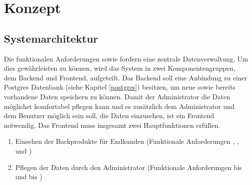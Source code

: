\chapter{Konzept}

\section{Systemarchitektur} \label{systemarchitektur}
Die funktionalen Anforderungen  sowie  fordern eine zentrale Datenverwaltung.
Um dies gewährleisten zu können, wird das System in zwei Komponentengruppen, dem Backend und Frontend, aufgeteilt.
Das Backend soll eine Anbindung zu einer Postgres Datenbank (siehe Kapitel \ref{postgres}) besitzen, um neue sowie bereits vorhandene Daten speichern zu können.
Damit der Administrator die Daten möglichst komfortabel pflegen kann und es zusätzlich dem Administrator und dem Benutzer möglich sein soll, die Daten einzusehen, ist ein Frontend notwendig.
Das Frontend muss insgesamt zwei Hauptfunktionen erfüllen.

\begin{enumerate}
	\item Einsehen der Backprodukte für Endkunden (Funktionale Anforderungen , ,  und )
	\item Pflegen der Daten durch den Administrator (Funktionale Anforderungen  bis  und  bis )
\end{enumerate}

